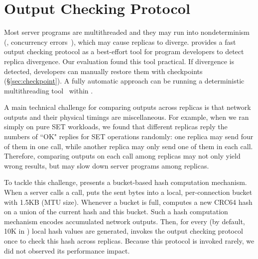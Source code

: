 \section{Output Checking Protocol} \label{sec:output}

Most server programs are multithreaded and they may run into nondeterminism 
(\eg, concurrency errors~\cite{lu:concurrency-bugs}), which may cause replicas 
to diverge. \xxx provides a fast output checking protocol as a best-effort tool 
for program developers to detect replica divergence. Our evaluation found this 
tool practical. If divergence is detected, developers can manually restore them 
with \xxx checkpoints (\S\ref{sec:checkpoint}). A fully automatic approach can 
be running a deterministic 
multithreading tool~\cite{parrot:sosp13,dthreads:sosp11,crane:sosp15} within 
\xxx.

% 

A main technical challenge for comparing outputs across replicas is that 
network outputs and their physical timings are miscellaneous. For example, when 
we ran \redis simply on pure SET workloads, we found that different replicas 
reply the numbers of ``OK" replies for SET operations randomly: one replica may 
send four of them in one \send call, while another replica may only send one of 
them in each \send call. Therefore, comparing outputs on each \send call among 
replicas may not only yield wrong results, but may slow down server programs 
among replicas.

To tackle this challenge, \xxx presents a bucket-based hash computation 
mechanism. When a server calls a \send call, \xxx puts the sent bytes into a 
local, per-connection bucket with 1.5KB (MTU size). Whenever a bucket 
is full, \xxx computes a new CRC64 hash on a union of the current hash and this 
bucket. Such a hash computation mechanism encodes accumulated network outputs. 
Then, for every \thashcomp (by default, 10K in \xxx) local hash values 
are generated, \xxx invokes the output checking protocol once to check this 
hash across replicas. Because this protocol is invoked rarely, we did not 
observed its performance impact.


